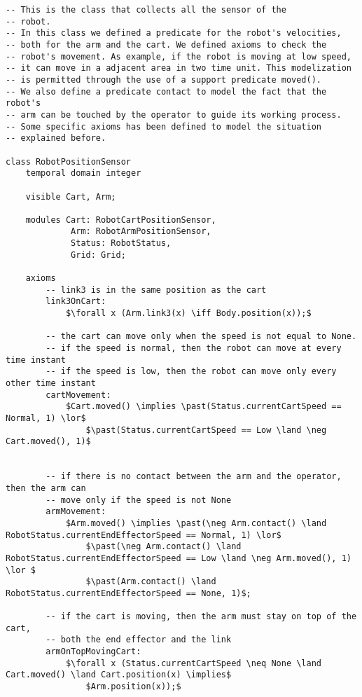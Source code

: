 \begin{lstlisting}[fontadjust, mathescape, frame=single] 
-- This is the class that collects all the sensor of the
-- robot.
-- In this class we defined a predicate for the robot's velocities,
-- both for the arm and the cart. We defined axioms to check the
-- robot's movement. As example, if the robot is moving at low speed,
-- it can move in a adjacent area in two time unit. This modelization
-- is permitted through the use of a support predicate moved().
-- We also define a predicate contact to model the fact that the robot's
-- arm can be touched by the operator to guide its working process.
-- Some specific axioms has been defined to model the situation
-- explained before.

class RobotPositionSensor
    temporal domain integer

    visible Cart, Arm;

    modules Cart: RobotCartPositionSensor,
             Arm: RobotArmPositionSensor,
             Status: RobotStatus,
             Grid: Grid;

    axioms
        -- link3 is in the same position as the cart
        link3OnCart: 
            $\forall x (Arm.link3(x) \iff Body.position(x));$

        -- the cart can move only when the speed is not equal to None.
        -- if the speed is normal, then the robot can move at every time instant
        -- if the speed is low, then the robot can move only every other time instant
        cartMovement:
            $Cart.moved() \implies \past(Status.currentCartSpeed == Normal, 1) \lor$
                $\past(Status.currentCartSpeed == Low \land \neg Cart.moved(), 1)$
            

        -- if there is no contact between the arm and the operator, then the arm can
        -- move only if the speed is not None
        armMovement:
            $Arm.moved() \implies \past(\neg Arm.contact() \land RobotStatus.currentEndEffectorSpeed == Normal, 1) \lor$
                $\past(\neg Arm.contact() \land RobotStatus.currentEndEffectorSpeed == Low \land \neg Arm.moved(), 1) \lor $
                $\past(Arm.contact() \land RobotStatus.currentEndEffectorSpeed == None, 1)$;

        -- if the cart is moving, then the arm must stay on top of the cart,
        -- both the end effector and the link
        armOnTopMovingCart: 
            $\forall x (Status.currentCartSpeed \neq None \land Cart.moved() \land Cart.position(x) \implies$
                $Arm.position(x));$



\end{lstlisting}
